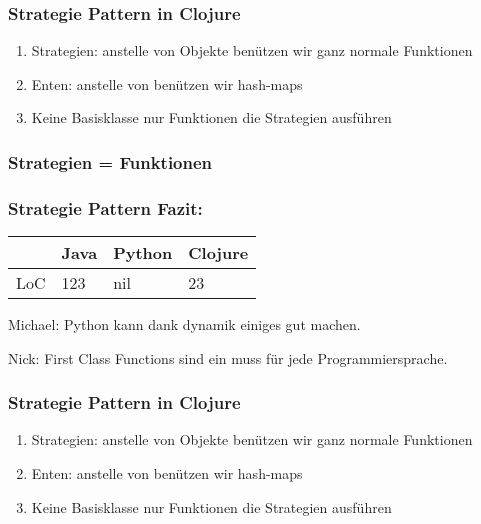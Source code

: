 \documentclass[compress, blue]{beamer}
\begin{document}

\begin{frame}\frametitle{Strategie Pattern in Clojure}
  \begin{enumerate}
  \item Strategien: anstelle von Objekte benützen wir ganz normale Funktionen
    \pause
  \item Enten: anstelle von benützen wir hash-maps
    \pause
  \item Keine Basisklasse nur Funktionen die Strategien ausführen 
    \pause
  \end{enumerate}
\end{frame}

\begin{frame}\frametitle{Strategien = Funktionen}
  
\end{frame}





\begin{frame}\frametitle{Strategie Pattern Fazit:}
  \begin{tabular}{l | l l l}
     & Java &  Python & Clojure  \\
     \hline
    LoC & 123 &  nil & 23  \\
  \end{tabular}
  \vspace{.5cm}

  \begin{block}{Michael:}
    Python kann dank dynamik einiges gut machen.
  \end{block}

  \begin{block}{Nick: }
    First Class Functions sind ein muss für jede Programmiersprache.
  \end{block}

\end{frame}




\begin{frame}\frametitle{Strategie Pattern in Clojure}
  \begin{enumerate}
  \item Strategien: anstelle von Objekte benützen wir ganz normale Funktionen
    \pause
  \item Enten: anstelle von benützen wir hash-maps
    \pause
  \item Keine Basisklasse nur Funktionen die Strategien ausführen 
    \pause
  \end{enumerate}
\end{frame}
\end{document}
